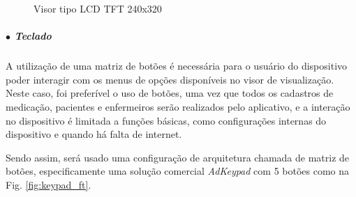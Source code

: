         \begin{figure}[H]
        \centering
        \hspace{0.1\textwidth}
        \caption{Visor tipo LCD TFT 240x320}
        \label{fig:display_lcd}
        \end{figure}
        
        
        
        \subparagraph*{$\bullet$ \textbf{Teclado}} \hfill
        
        A utilização de uma matriz de botões é necessária para o usuário do dispositivo poder interagir com os menus de opções disponíveis no visor de visualização. Neste caso, foi preferível o uso de botões, uma vez que todos os cadastros de medicação, pacientes e enfermeiros serão realizados pelo aplicativo, e a interação no dispositivo é limitada a funções básicas, como configurações internas do dispositivo e quando há falta de internet. 
        
        
        Sendo assim, será usado uma configuração de arquitetura chamada de matriz de botões, especificamente uma solução comercial \textit{AdKeypad} com 5 botões como na Fig. \ref{fig:keypad_ft}.
        
